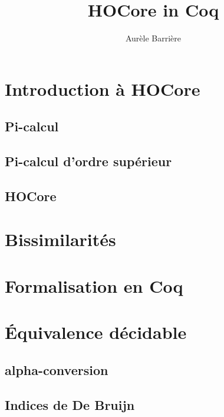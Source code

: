 \documentclass{article}
\title{HOCore in Coq}
\author{Aur\`ele Barri\`ere}
\begin{document}
\maketitle
\tableofcontents

\section{Introduction à HOCore}
\subsection{Pi-calcul}
\subsection{Pi-calcul d'ordre supérieur}
\subsection{HOCore}

\section{Bissimilarités}

\section{Formalisation en Coq}

\section{Équivalence décidable}
\subsection{alpha-conversion}
\subsection{Indices de De Bruijn}
\end{document}
